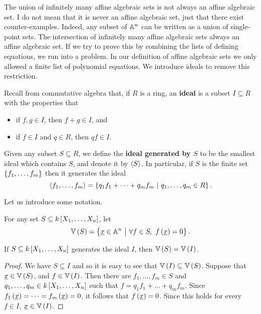 
The union of infinitely many affine algebraic sets is not always an affine algebraic set. I do not mean that it is never an affine algebraic set, just that there exist counter-examples. Indeed, any subset of $ \AA^n $ can be written as a union of single-point sets. The intersection of infinitely many affine algebraic sets always an affine algebraic set. If we try to prove this by combining the lists of defining equations, we run into a problem. In our definition of affine algebraic sets we only allowed a finite list of polynomial equations. We introduce ideals to remove this restriction.

\begin{definition*}
Recall from commutative algebra that, if $ R $ is a ring, an \textbf{ideal} is a subset $ I \subseteq R $ with the properties that
\begin{itemize}
\item if $ f, g \in I $, then $ f + g \in I $, and
\item if $ f \in I $ and $ q \in R $, then $ qf \in I $.
\end{itemize}
Given any subset $ S \subseteq R $, we define the \textbf{ideal generated by $ S $} to be the smallest ideal which contains $ S $, and denote it by $ \abr{S} $. In particular, if $ S $ is the finite set $ \cbr{f_1, \dots, f_m} $ then it generates the ideal
$$ \abr{f_1, \dots, f_m} = \cbr{q_1f_1 + \dots + q_mf_m \st q_1, \dots, q_m \in R}. $$
\end{definition*}

Let us introduce some notation.

\begin{definition*}
For any set $ S \subseteq k\sbr{X_1, \dots, X_n} $, let
$$ \VV\br{S} = \cbr{\underline{x} \in \AA^n \st \forall f \in S, \ f\br{\underline{x}} = 0}. $$
\end{definition*}

\begin{lemma}
\label{lem:vs}
If $ S \subseteq k\sbr{X_1, \dots, X_n} $ generates the ideal $ I $, then $ \VV\br{S} = \VV\br{I} $.
\end{lemma}

\begin{proof}
We have $ S \subseteq I $ and so it is easy to see that $ \VV\br{I} \subseteq \VV\br{S} $. Suppose that $ \underline{x} \in \VV\br{S} $, and $ f \in \VV\br{I} $. Then there are $ f_1, \dots, f_m \in S $ and $ q_1, \dots, q_m \in k\sbr{X_1, \dots, X_n} $ such that $ f = q_1f_1 + \dots + q_mf_m $. Since $ f_1\br{\underline{x}} = \dots = f_m\br{\underline{x}} = 0 $, it follows that $ f\br{\underline{x}} = 0 $. Since this holds for every $ f \in I $, $ \underline{x} \in \VV\br{I} $.
\end{proof}

